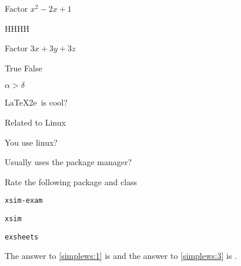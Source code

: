 \documentclass{article}
\begin{document}
\begin{enumext}[save-ans=simplews,columns=2,check-ans=true,show-ans=true,nosep,save-ref=true,wrap-label={\tikz[scale=0.25]\duck[signpost=\scalebox{0.6}{#1}];}]
  \item Factor $x^{2}-2x+1$
    \begin{anskey*}
    HHHH
    \end{anskey*}
  \item Factor $3x+3y+3z$ 
  \item True False
    \begin{enumext}[nosep]
      \item $\alpha > \delta$ 
      \item \LaTeX2e\ is cool? 
    \end{enumext}
  \item Related to Linux
    \begin{enumext}[nosep]
      \item You use linux? 
      \item Usually uses the package manager? 
      \item Rate the following package and class
        \begin{enumext}[nosep]
          \item \texttt{xsim-exam} 
          \item \texttt{xsim} 
          \item \texttt{exsheets} 
        \end{enumext}
    \end{enumext}
\end{enumext}

The answer to \ref{simplews:1} is  and the answer
to \ref{simplews:3} is .

\end{document}
